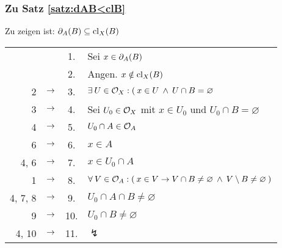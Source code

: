 	
\subsubsection{Zu Satz \ref{satz:dAB<clB}}\label{anh:dAB<clB}
Zu zeigen ist: $\partial_A(B) \subseteq \text{cl}_X(B)$
\\

\begin{longtable}{r c c l}
	& & 1. & Sei $x \in \partial_A(B)$ \\
	& & 2. & Angen. $x \notin \text{cl}_X(B)$ \\
	2 & $\rightarrow$ & 3. & $\exists\: U \in \mathcal{O}_X : (\: x \in U \:\land\: U \cap B = \varnothing$ \\
	3 & $\rightarrow$ & 4. & Sei $U_0 \in \mathcal{O}_X$ mit $x \in U_0$ und $U_0 \cap B = \varnothing$ \\
	4 & $\rightarrow$ & 5. & $U_0 \cap A \in \mathcal{O}_A$ \\
	6 & $\rightarrow$ & 6. & $x \in A$ \\
	4, 6 & $\rightarrow$ & 7. & $x \in U_0 \cap A$ \\
	1 & $\rightarrow$ & 8. & $\forall\: V \in \mathcal{O}_A : (\: x \in V \to V \cap B \neq \varnothing \:\land\: V \setminus B \neq \varnothing \:)$ \\
	4, 7, 8 & $\rightarrow$ & 9. & $U_0 \cap A \cap B \neq \varnothing$ \\
	9 & $\rightarrow$ & 10. & $U_0 \cap B \neq \varnothing$ \\
	4, 10 & $\rightarrow$ & 11. & $\lightning$ \\
\end{longtable}



